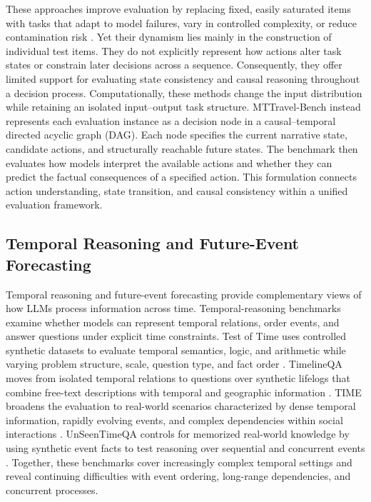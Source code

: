 \documentclass[pdflatex,sn-mathphys-num]{sn-jnl}%
\theoremstyle{thmstyleone}%
\theoremstyle{thmstyletwo}%
\theoremstyle{thmstylethree}%
\begin{document}
These approaches improve evaluation by replacing fixed, easily saturated items with tasks that adapt to model failures, vary in controlled complexity, or reduce contamination risk \cite{kiela2021dynabench,hu2025dynacode,zhu2024dynamic}. Yet their dynamism lies mainly in the construction of individual test items. They do not explicitly represent how actions alter task states or constrain later decisions across a sequence. Consequently, they offer limited support for evaluating state consistency and causal reasoning throughout a decision process. Computationally, these methods change the input distribution while retaining an isolated input--output task structure. MTTravel-Bench instead represents each evaluation instance as a decision node in a causal--temporal directed acyclic graph (DAG). Each node specifies the current narrative state, candidate actions, and structurally reachable future states. The benchmark then evaluates how models interpret the available actions and whether they can predict the factual consequences of a specified action. This formulation connects action understanding, state transition, and causal consistency within a unified evaluation framework.

\subsection{Temporal Reasoning and Future-Event Forecasting}
Temporal reasoning and future-event forecasting provide complementary views of how LLMs process information across time. Temporal-reasoning benchmarks examine whether models can represent temporal relations, order events, and answer questions under explicit time constraints. Test of Time uses controlled synthetic datasets to evaluate temporal semantics, logic, and arithmetic while varying problem structure, scale, question type, and fact order \cite{fatemi2024test}. TimelineQA moves from isolated temporal relations to questions over synthetic lifelogs that combine free-text descriptions with temporal and geographic information \cite{tan2023timelineqa}. TIME broadens the evaluation to real-world scenarios characterized by dense temporal information, rapidly evolving events, and complex dependencies within social interactions \cite{wei2025time}. UnSeenTimeQA controls for memorized real-world knowledge by using synthetic event facts to test reasoning over sequential and concurrent events \cite{uddin2024unseentimeqa}. Together, these benchmarks cover increasingly complex temporal settings and reveal continuing difficulties with event ordering, long-range dependencies, and concurrent processes.
\end{document}
